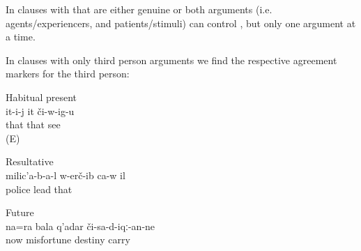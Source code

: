 In clauses with  that are either genuine  or  both arguments (i.e. agents\slash experiencers, and patients\slash stimuli) can control , but only one argument at a time. 

In clauses with only third person arguments we find the respective agreement markers for the third person:
%
\begin{exe}
		\ex	Habitual present\\	\label{ex:S/he sees him habitual present}
		\gll	it-i-j	it	či-w-ig-u\\
			that	that	see\\
		\glt	{} (E)

		\ex	Resultative\\		\label{ex:The police took him resultative}
		\gll	milic'a-b-a-l	w-erč-ib	ca-w	il\\
			police	lead		that\\
		\glt	{}

		\ex	Future\\		\label{ex:Now he will also bring trouble future}
		\gll	na=ra	bala	q'adar	či-sa-d-iqː-an-ne\\
			now	misfortune	destiny	carry\\
		\glt	{}
\end{exe}

